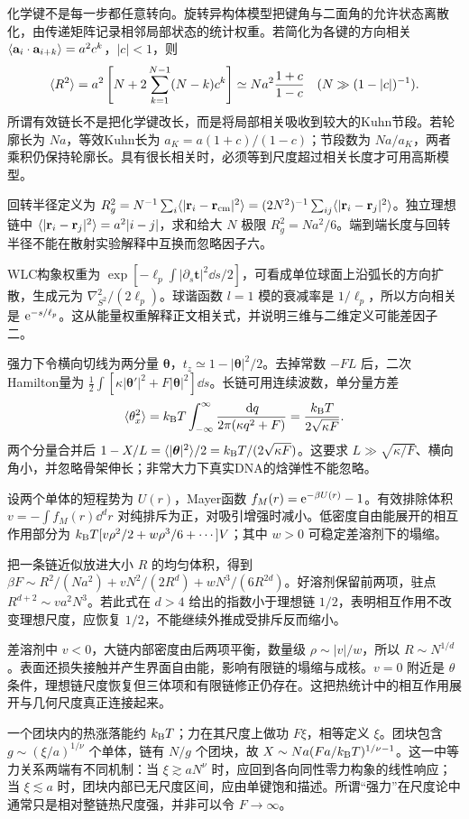 化学键不是每一步都任意转向。旋转异构体模型把键角与二面角的允许状态离散化，由传递矩阵记录相邻局部状态的统计权重。若简化为各键的方向相关 $\langle \mathbf a_i\cdot\mathbf a_{i+k}\rangle=a^2c^k$，$|c|<1$，则
\[
\langle R^2\rangle=a^2\left[N+2\sum_{k=1}^{N-1}(N-k)c^k\right]
\simeq Na^2\frac{1+c}{1-c}\quad(N\gg(1-|c|)^{-1}).
\]
所谓有效链长不是把化学键改长，而是将局部相关吸收到较大的Kuhn节段。若轮廓长为 $Na$，等效Kuhn长为 $a_K=a(1+c)/(1-c)$；节段数为 $Na/a_K$，两者乘积仍保持轮廓长。具有很长相关时，必须等到尺度超过相关长度才可用高斯模型。

回转半径定义为 $R_g^2=N^{-1}\sum_i\langle |\mathbf r_i-\mathbf r_{\rm cm}|^2\rangle= (2N^2)^{-1}\sum_{ij}\langle |\mathbf r_i-\mathbf r_j|^2\rangle$。独立理想链中 $\langle |\mathbf r_i-\mathbf r_j|^2\rangle=a^2|i-j|$，求和给大 $N$ 极限 $R_g^2=Na^2/6$。端到端长度与回转半径不能在散射实验解释中互换而忽略因子六。

WLC构象权重为 $\exp[-\ell_p\int|\partial_s\mathbf t|^2\dd s/2]$，可看成单位球面上沿弧长的方向扩散，生成元为 $\nabla_{S^2}^2/(2\ell_p)$。球谐函数 $l=1$ 模的衰减率是 $1/\ell_p$，所以方向相关是 $\mathrm e^{-s/\ell_p}$。这从能量权重解释正文相关式，并说明三维与二维定义可能差因子二。

强力下令横向切线为两分量 $\boldsymbol\theta$，$t_z\simeq1-|\boldsymbol\theta|^2/2$。去掉常数 $-FL$ 后，二次Hamilton量为 $\tfrac12\int[\kappa|\boldsymbol\theta'|^2+F|\boldsymbol\theta|^2]\dd s$。长链可用连续波数，单分量方差
\[
\langle \theta_x^2\rangle=k_{\mathrm B} T\int_{-\infty}^{\infty}\frac{\,\mathrm d q}{2\pi(\kappa q^2+F)}
=\frac{k_{\mathrm B} T}{2\sqrt{\kappa F}}.
\]
两个分量合并后 $1-X/L=\langle |\boldsymbol\theta|^2\rangle/2=k_{\mathrm B} T/(2\sqrt{\kappa F})$。这要求 $L\gg\sqrt{\kappa/F}$、横向角小，并忽略骨架伸长；非常大力下真实DNA的焓弹性不能忽略。

设两个单体的短程势为 $U(r)$，Mayer函数 $f_M(r)=\mathrm e^{-\beta U(r)}-1$。有效排除体积 $v=-\int f_M(r)\dd^dr$ 对纯排斥为正，对吸引增强时减小。低密度自由能展开的相互作用部分为 $k_{\mathrm B} T[v\rho^2/2+w\rho^3/6+\cdots]V$；其中 $w>0$ 可稳定差溶剂下的塌缩。

把一条链近似放进大小 $R$ 的均匀体积，得到 $\beta F\sim R^2/(Na^2)+vN^2/(2R^d)+wN^3/(6R^{2d})$。好溶剂保留前两项，驻点 $R^{d+2}\sim va^2N^3$。若此式在 $d>4$ 给出的指数小于理想链 $1/2$，表明相互作用不改变理想尺度，应恢复 $1/2$，不能继续外推成受排斥反而缩小。

差溶剂中 $v<0$，大链内部密度由后两项平衡，数量级 $\rho\sim|v|/w$，所以 $R\sim N^{1/d}$。表面还损失接触并产生界面自由能，影响有限链的塌缩与成核。$v=0$ 附近是 $\theta$ 条件，理想链尺度恢复但三体项和有限链修正仍存在。这把热统计中的相互作用展开与几何尺度真正连接起来。

一个团块内的热涨落能约 $k_{\mathrm B} T$；力在其尺度上做功 $F\xi$，相等定义 $\xi$。团块包含 $g\sim(\xi/a)^{1/\nu}$ 个单体，链有 $N/g$ 个团块，故 $X\sim Na(Fa/k_{\mathrm B} T)^{1/\nu-1}$。这一中等力关系两端有不同机制：当 $\xi\gtrsim aN^\nu$ 时，应回到各向同性零力构象的线性响应；当 $\xi\lesssim a$ 时，团块内部已无尺度区间，应由单键饱和描述。所谓“强力”在尺度论中通常只是相对整链热尺度强，并非可以令 $F\to\infty$。
